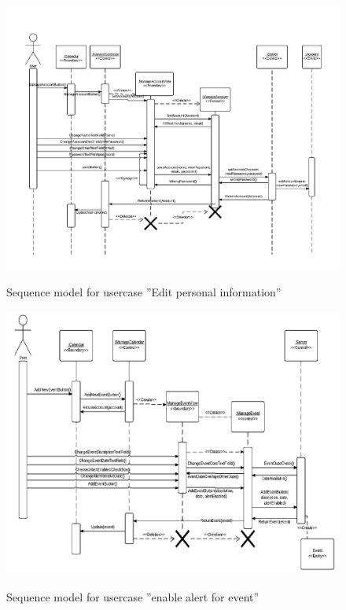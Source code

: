 \documentclass{article}
\begin{document}
	\begin{figure}[!htb]
                \caption{Sequence model for usercase ''Edit personal information''}
		\includegraphics[scale = 0.6]{SequenceModelEditpersonalinformation.png}\\
		\pagebreak{}
	\end{figure}
	
		

	\begin{figure}[!htb]
                \caption{Sequence model for usercase ''enable alert for event''}
		\includegraphics[scale = 0.6]{SequenceModelEnableAlert.png}\\
		\pagebreak{}
	\end{figure}
\end{document}
